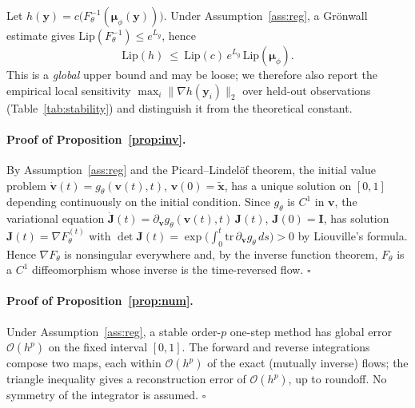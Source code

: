 \begin{proposition}
\label{prop:stab}
Let $h(\mathbf{y})=c\big(F_\theta^{-1}(\boldsymbol{\mu}_\phi(\mathbf{y}))\big)$.
Under Assumption~\ref{ass:reg}, a Gr\"onwall estimate gives
$\mathrm{Lip}(F_\theta^{-1})\le e^{L_g}$, hence
\begin{equation}
\mathrm{Lip}(h)\ \le\ \mathrm{Lip}(c)\,e^{L_g}\,\mathrm{Lip}(\boldsymbol{\mu}_\phi).
\end{equation}
This is a \emph{global} upper bound and may be loose; we therefore also report
the empirical local sensitivity
$\max_i\lVert\nabla h(\mathbf{y}_i)\rVert_2$ over held-out observations
(Table~\ref{tab:stability}) and distinguish it from the theoretical constant.
\end{proposition}


\paragraph{Proof of Proposition~\ref{prop:inv}.}
By Assumption~\ref{ass:reg} and the Picard--Lindel\"of theorem, the initial value
problem $\dot{\mathbf{v}}(t)=g_\theta(\mathbf{v}(t),t)$,
$\mathbf{v}(0)=\tilde{\mathbf{x}}$, has a unique solution on $[0,1]$ depending
continuously on the initial condition. Since $g_\theta$ is $C^{1}$ in
$\mathbf{v}$, the variational equation
$\dot{\mathbf{J}}(t)=\partial_{\mathbf{v}}g_\theta(\mathbf{v}(t),t)\,\mathbf{J}(t)$,
$\mathbf{J}(0)=\mathbf{I}$, has solution
$\mathbf{J}(t)=\nabla F_\theta^{(t)}$ with
$\det\mathbf{J}(t)=\exp\!\big(\int_0^t\mathrm{tr}\,\partial_{\mathbf{v}}
g_\theta\,ds\big)>0$ by Liouville's formula. Hence $\nabla F_\theta$ is
nonsingular everywhere and, by the inverse function theorem, $F_\theta$ is a
$C^{1}$ diffeomorphism whose inverse is the time-reversed flow. \hfill$\square$

\paragraph{Proof of Proposition~\ref{prop:num}.}
Under Assumption~\ref{ass:reg}, a stable order-$p$ one-step method has global
error $\mathcal{O}(h^{p})$ on the fixed interval $[0,1]$. The forward and reverse
integrations compose two maps, each within $\mathcal{O}(h^{p})$ of the exact
(mutually inverse) flows; the triangle inequality gives a reconstruction error of
$\mathcal{O}(h^{p})$, up to roundoff. No symmetry of the integrator is assumed.
\hfill$\square$

